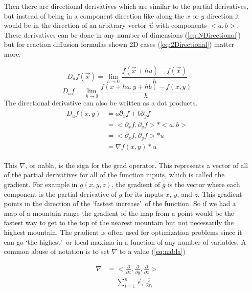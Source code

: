 \documentclass[12pt, letterpaper]{article}
\newcommand{\sorta}[1]{\lq #1\rq \,}
\begin{document}
Then there are directional derivatives which are similar to the partial derivatives, but instead of being in 
a component direction like along the $x$ or $y$ direction it would be in the direction of an arbitrary vector
$\vec{u}$ with components $ <a, b> $. These derivatives can be done in any number of dimensions 
(\ref{eq:NDirectional}) but for reaction diffusion formulas shown 2D cases (\ref{eq:2Directional}) matter
more.

\begin{equation}
  D_u{f(\vec{x})} = \lim_{h \to 0} \frac{f(\vec{x} + hu) − f(\vec{x})}{h}
  \label{eq:NDirectional}
\end{equation}
\begin{equation}
  D_u f = \lim_{h \to 0} \frac{f(x + ha, y+ hb) − f(x, y)}{h}
  \label{eq:2Directional}
\end{equation}
The directional derivative can also be written as a dot products.
\begin{gather*}
\begin{aligned}
  D_u f(x,y) &= a\partial_x f + b\partial_y f \\
             &= <\partial_x f, \partial_y f> * <a, b> \\
             &= <\partial_x f, \partial_y f> * u \\
             &= \nabla f(x,y) * u 
\end{aligned}
\end{gather*}

This $\nabla$, or nabla, is the sign for the grad operator. This represents a vector of all
of the partial derivatives for all of the function inputs, which is called the gradient. For example in $g(x,
y, z)$, the gradient of $g$ is the vector where each component is the partial derivative of $g$ for its
inputs $x$, $y$, and $z$. This gradient points in the direction of the \sorta{fastest increase} of the
function. So if we had a map of a mountain range the gradient of the map from a point would be the fastest
way to get to the top of the nearest mountain but not necessarily the highest mountain. The gradient is often
used for optimization problems since it can go \sorta{the highest} or local maxima in a function of any
number of variables. A common abuse of notation is to set $\nabla$ to a value (\ref{eq:nabla})

\begin{equation}
  \begin{aligned}
    \nabla &= <\frac{\partial}{\partial x}, \frac{\partial}{\partial y}, \frac{\partial}{\partial z}> \\
           &= \sum_{i=1}^{n} \vec{e}_{i} \: \frac{\partial}{\partial x_i}
  \end{aligned}
  \label{eq:nabla}
\end{equation}
\end{document}
